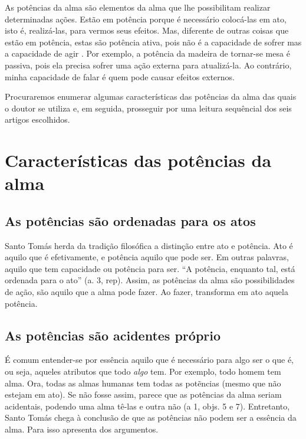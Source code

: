 \documentclass[
	article,			%
	12pt,				%
	oneside,			%
	a4paper,			%
	english,			%
	brazil,				%
	sumario=tradicional,
	doublespacing
	]{abntex2}
\begin{document}
As potências da alma são elementos da alma que lhe possibilitam realizar determinadas ações. Estão em potência porque é necessário colocá-las em ato, isto é, realizá-las, para vermos seus efeitos. Mas, diferente de outras coisas que estão em potência, estas são potência ativa, pois não é a capacidade de sofrer mas a capacidade de agir \cite{field_st._1984}. Por exemplo, a potência da madeira de tornar-se mesa é passiva, pois ela precisa sofrer uma ação externa para atualizá-la. Ao contrário, minha capacidade de falar é quem pode causar efeitos externos.


Procuraremos enumerar algumas características das potências da alma das quais o doutor se utiliza e, em seguida, prosseguir por uma leitura sequêncial dos seis artigos escolhidos.

\section{Características das potências da alma}



\subsection{As potências são ordenadas para os atos}

Santo Tomás herda da tradição filosófica a distinção entre ato e potência.
Ato é aquilo que é efetivamente, e potência aquilo que pode ser.
Em outras palavras, aquilo que tem capacidade ou potência para ser.
``A potência, enquanto tal, está ordenada para o ato'' (a. 3, rep).
Assim, as potências da alma são possibilidades de ação, são aquilo que a alma pode fazer.
Ao fazer, transforma em ato aquela potência.

\subsection{As potências são acidentes próprio}

É comum entender-se por essência aquilo que é necessário para algo ser o que é, ou seja, aqueles atributos que todo \emph{algo} tem. Por exemplo, todo homem tem alma. Ora, todas as almas humanas tem todas as potẽncias (mesmo que não estejam em ato). Se não fosse assim, parece que as potências da alma seriam acidentais, podendo uma alma tê-las e outra não (a 1, objs. 5 e 7). Entretanto, Santo Tomás chega à conclusão de que as potências não podem ser a essência da alma. Para isso apresenta dos argumentos.
\end{document}
